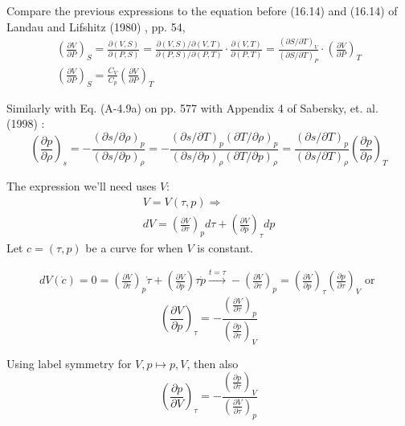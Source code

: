 \documentclass[10pt]{amsart}
\begin{document}
\begin{multicols*}{2}
Compare the previous expressions to the equation before (16.14) and (16.14) of Landau and Lifshitz (1980) \cite{LLandauELifshitz1980}, pp. 54,
\[
\begin{gathered}
\left( \frac{\partial V}{ \partial  P } \right)_S = \frac{\partial (V, S) }{ \partial (P, S)} = \frac{\partial( V,S) / \partial (V, T) }{ \partial (P, S)/ \partial (P, T)} \cdot \frac{ \partial (V, T) }{ \partial (P ,T)} = \frac{(\partial S/ \partial T)_V }{ (\partial S / \partial T)_P} \cdot \left( \frac{ \partial V}{ \partial P} \right)_T \\
\left( \frac{\partial V}{ \partial  P } \right)_S = \frac{ C_V}{ C_p} \left( \frac{\partial V}{ \partial  P } \right)_T
\end{gathered}
\]

Similarly with Eq. (A-4.9a) on pp. 577 with Appendix 4 of  Sabersky, et. al. (1998) \cite{SAHG1998}:
\[
\left( \frac{ \partial p }{ \partial \rho} \right)_s = - \frac{ (\partial s / \partial \rho)_p }{ (\partial s / \partial p)_{\rho}}  = - \frac{ (\partial s / \partial T)_p (\partial T / \partial \rho)_p }{ (\partial s / \partial p)_{\rho} (\partial T / \partial p )_{\rho}} = \frac{ (\partial s / \partial T)_p }{ (\partial s / \partial T)_{\rho}} \left( \frac{ \partial p }{ \partial \rho} \right)_T
\]

The expression we'll need uses $V$:
\[
\begin{gathered}
V = V(\tau, p) \Longrightarrow \\
dV = \left( \frac{\partial V}{\partial \tau} \right)_p d\tau + \left( \frac{\partial V}{\partial p} \right)_{\tau} dp 
\end{gathered}
\]
Let $c=(\tau, p)$  be a curve for when $V$ is constant.

\[
\begin{gathered}
dV(\dot{c}) = 0 = \left( \frac{\partial V}{\partial \tau} \right)_p \dot{\tau} + \left( \frac{\partial V}{ \partial p } \right){\tau} \dot{p} \xrightarrow{ t = \tau} - \left( \frac{\partial V}{ \partial \tau} \right)_p = \left( \frac{\partial V}{\partial p} \right)_{\tau} \left( \frac{\partial p}{\partial \tau} \right)_V \text{ or } 
\end{gathered}
\]
\begin{equation}
\left( \frac{\partial V}{\partial p} \right)_{\tau} = -\frac{\left( \frac{\partial V}{\partial \tau} \right)_p }{ \left( \frac{\partial p}{\partial \tau} \right)_V}
\end{equation}

Using label symmetry for $V, p \mapsto p, V$, then also
\[
\left( \frac{\partial p}{\partial V} \right)_{\tau} = -\frac{\left( \frac{\partial p}{\partial \tau} \right)_V }{ \left( \frac{\partial V}{\partial \tau} \right)_p}
\]


\end{multicols*}
\end{document}
